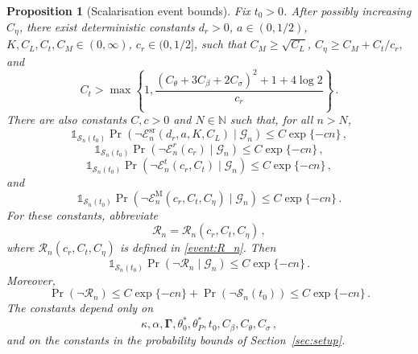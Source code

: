 \documentclass{article}
\newtheorem{proposition}[theorem]{Proposition}
\theoremstyle{definition}
\newcommand*{\bb}{\boldsymbol}
\begin{document}
\begin{bibunit}
\begin{proposition}[Scalarisation event bounds]
\label{prop:scalarisation_events}
Fix $t_0>0$. After possibly increasing $C_\eta$, there exist deterministic
constants
$
	d_r>0$, 
	$
	a\in(0,1/2)$, 
	$
	K,C_L,C_t,C_M\in(0,\infty)$, 
	$
	c_r\in(0,1/2]
$,
such that
$
	C_M\geq\sqrt{C_L}$, 
	$
	C_\eta
	\geq
	C_M+
	{C_t} / {c_r},
$
and
\begin{equation}
\label{eq:scalarisation_restricted_Ct_bound}
	C_t
	>
	\max\left\{
		1,
		\frac{
			(C_\theta+3C_\beta+2C_\sigma)^2
			+
			1
			+
			4\log2
		}{c_r}
	\right\}\,.
\end{equation}
There are also constants $C,c>0$ and $N\in\mathbb N$ such that, for all
$n>N$,
\begin{equation}
\label{eq:scalarisation_event_sr_prob}
	\mathds{1}_{\mathcal S_n(t_0)}
	\Pr\left(
		\lnot\mathcal E_n^{\mathrm{sr}}(d_r,a,K,C_L)
		\mid
		\mathcal G_n
	\right)
	\leq
	C\exp\{-cn\}\,,
\end{equation}
\begin{equation}
\label{eq:scalarisation_event_r_prob}
	\mathds{1}_{\mathcal S_n(t_0)}
	\Pr\left(
		\lnot\mathcal E_n^r(c_r)
		\mid
		\mathcal G_n
	\right)
	\leq
	C\exp\{-cn\}\,,
\end{equation}
\begin{equation}
\label{eq:scalarisation_event_t_prob}
	\mathds{1}_{\mathcal S_n(t_0)}
	\Pr\left(
		\lnot\mathcal E_n^t(c_r,C_t)
		\mid
		\mathcal G_n
	\right)
	\leq
	C\exp\{-cn\}\,,
\end{equation}
and
\begin{equation}
\label{eq:scalarisation_event_M_prob}
	\mathds{1}_{\mathcal S_n(t_0)}
	\Pr\left(
		\lnot\mathcal E_n^{\mathrm M}(c_r,C_t,C_\eta)
		\mid
		\mathcal G_n
	\right)
	\leq
	C\exp\{-cn\}\,.
\end{equation}
For these constants, abbreviate
$$
	\mathcal R_n
	=
	\mathcal R_n(c_r,C_t,C_\eta)\,,
$$
where $\mathcal R_n(c_r,C_t,C_\eta)$ is defined in
\eqref{event:R_n}. Then
\begin{equation}
\label{eq:Rn_cond_prob}
	\mathds{1}_{\mathcal S_n(t_0)}
	\Pr\left(
		\lnot\mathcal R_n
		\mid
		\mathcal G_n
	\right)
	\leq
	C\exp\{-cn\}\,.
\end{equation}
Moreover,
\begin{equation}
\label{eq:Rn_uncond_prob}
	\Pr\left(
		\lnot\mathcal R_n
	\right)
	\leq
	C\exp\{-cn\}
	+
	\Pr\left(
		\lnot\mathcal S_n(t_0)
	\right)
	\leq
	C\exp\{-cn\}\,.
\end{equation}
The constants depend only on
$$
	\kappa,
	\alpha,
	\bb\Gamma,
	\theta_0^*,
	\theta_P^*,
	t_0,
	C_\beta,
	C_\theta,
	C_\sigma\,,
$$
and on the constants in the probability bounds of
Section~\ref{sec:setup}.
\end{proposition}


\end{bibunit}
\end{document}
